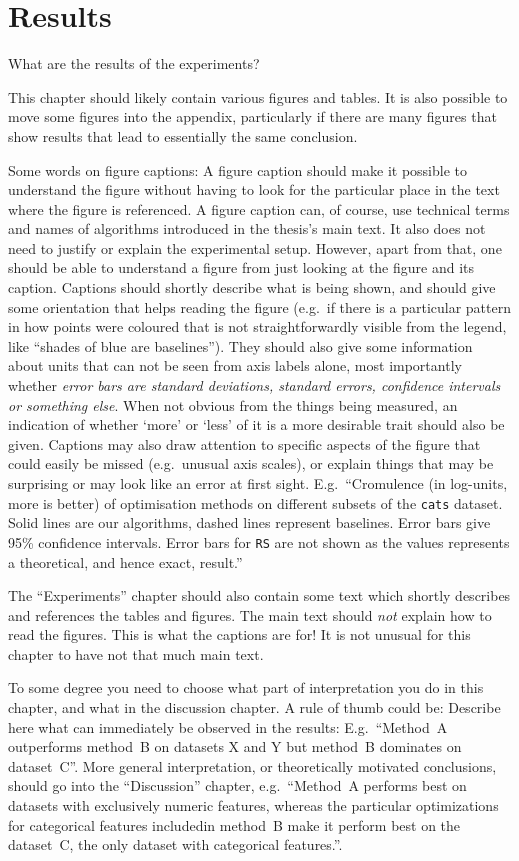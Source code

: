 \chapter{Results}\label{chap:results}

What are the results of the experiments?

This chapter should likely contain various figures and tables.
It is also possible to move some figures into the appendix, particularly if there are many figures that show results that lead to essentially the same conclusion.

Some words on figure captions:
A figure caption should make it possible to understand the figure without having to look for the particular place in the text where the figure is referenced.
A figure caption can, of course, use technical terms and names of algorithms introduced in the thesis's main text.
It also does not need to justify or explain the experimental setup.
However, apart from that, one should be able to understand a figure from just looking at the figure and its caption.
Captions should shortly describe what is being shown, and should give some orientation that helps reading the figure (e.g.\ if there is a particular pattern in how points were coloured that is not straightforwardly visible from the legend, like ``shades of blue are baselines'').
They should also give some information about units that can not be seen from axis labels alone, most importantly whether \emph{error bars are standard deviations, standard errors, confidence intervals or something else}.
When not obvious from the things being measured, an indication of whether `more' or `less' of it is a more desirable trait should also be given. 
Captions may also draw attention to specific aspects of the figure that could easily be missed (e.g.\ unusual axis scales), or explain things that may be surprising or may look like an error at first sight.
E.g.\ ``Cromulence (in log-units, more is better) of optimisation methods on different subsets of the \texttt{cats} dataset. Solid lines are our algorithms, dashed lines represent baselines. Error bars give 95\% confidence intervals. Error bars for \texttt{RS} are not shown as the values represents a theoretical, and hence exact, result.''

The ``Experiments'' chapter should also contain some text which shortly describes and references the tables and figures.
The main text should \emph{not} explain how to read the figures.
This is what the captions are for!
It is not unusual for this chapter to have not that much main text.

To some degree you need to choose what part of interpretation you do in this chapter, and what in the discussion chapter.
A rule of thumb could be:
Describe here what can immediately be observed in the results:
E.g.\ ``Method~A outperforms method~B on datasets X and Y but method~B dominates on dataset~C''.
More general interpretation, or theoretically motivated conclusions, should go into the ``Discussion'' chapter, e.g.\ ``Method~A performs best on datasets with exclusively numeric features, whereas the particular optimizations for categorical features includedin method~B make it perform best on the dataset~C, the only dataset with categorical features.''.

